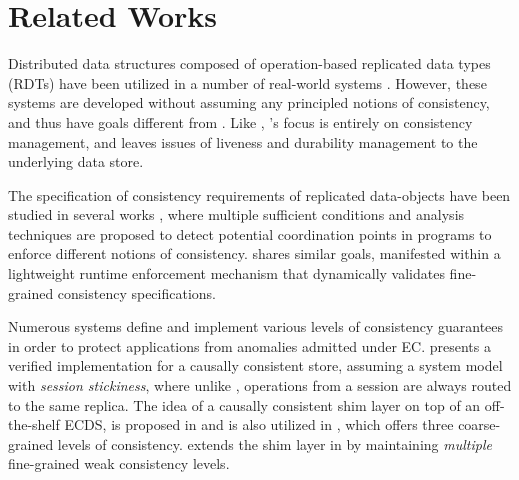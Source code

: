 \section{Related Works}
\label{sec:rel_works}

Distributed data structures composed of operation-based replicated
data types (RDTs) \cite{rdt,crdt} have been utilized in a number of
real-world systems \cite{tango,cassandra}.  However, these systems are
developed without assuming any principled notions of consistency, and
thus have goals different from \tool.  Like \cite{bolton}, \tool's
focus is entirely on consistency management, and leaves issues of
liveness and durability management to the underlying data store.


The specification of consistency requirements of replicated
data-objects have been studied in several works
\cite{autoc,mahsa,bloom}, where multiple sufficient conditions and
analysis techniques are proposed to detect potential coordination
points in programs to enforce different notions of consistency.  \tool
shares similar goals, manifested within a lightweight runtime
enforcement mechanism that dynamically validates fine-grained
consistency specifications.

Numerous systems \cite{geofast,petersen,cbs,chapar,bolton,quelea}
define and implement various levels of consistency guarantees in order
to protect applications from anomalies admitted under EC.
\cite{chapar} presents a verified implementation for a causally
consistent store, assuming a system model with \emph{session
  stickiness}, where unlike \tool, operations from a session are
always routed to the same replica. The idea of a causally consistent
shim layer on top of an off-the-shelf ECDS, is proposed in
\cite{bolton} and is also utilized in \cite{quelea}, which offers
three coarse-grained levels of consistency.  \tool extends the shim
layer in \cite{quelea} by maintaining \emph{multiple} fine-grained
weak consistency levels.











